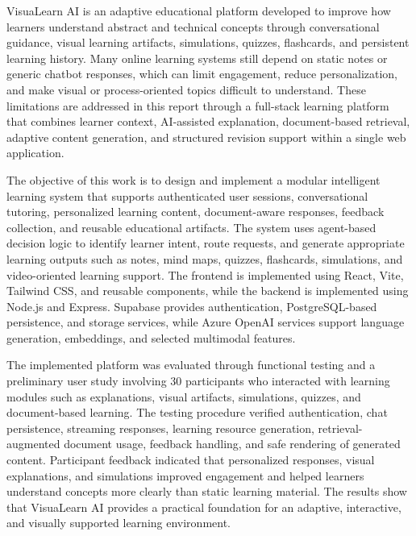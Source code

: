 VisuaLearn AI is an adaptive educational platform developed to improve how learners understand abstract and technical concepts through conversational guidance, visual learning artifacts, simulations, quizzes, flashcards, and persistent learning history. Many online learning systems still depend on static notes or generic chatbot responses, which can limit engagement, reduce personalization, and make visual or process-oriented topics difficult to understand. These limitations are addressed in this report through a full-stack learning platform that combines learner context, AI-assisted explanation, document-based retrieval, adaptive content generation, and structured revision support within a single web application.

The objective of this work is to design and implement a modular intelligent learning system that supports authenticated user sessions, conversational tutoring, personalized learning content, document-aware responses, feedback collection, and reusable educational artifacts. The system uses agent-based decision logic to identify learner intent, route requests, and generate appropriate learning outputs such as notes, mind maps, quizzes, flashcards, simulations, and video-oriented learning support. The frontend is implemented using React, Vite, Tailwind CSS, and reusable components, while the backend is implemented using Node.js and Express. Supabase provides authentication, PostgreSQL-based persistence, and storage services, while Azure OpenAI services support language generation, embeddings, and selected multimodal features.

The implemented platform was evaluated through functional testing and a preliminary user study involving 30 participants who interacted with learning modules such as explanations, visual artifacts, simulations, quizzes, and document-based learning. The testing procedure verified authentication, chat persistence, streaming responses, learning resource generation, retrieval-augmented document usage, feedback handling, and safe rendering of generated content. Participant feedback indicated that personalized responses, visual explanations, and simulations improved engagement and helped learners understand concepts more clearly than static learning material. The results show that VisuaLearn AI provides a practical foundation for an adaptive, interactive, and visually supported learning environment.
